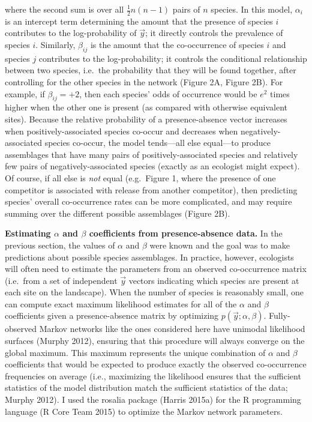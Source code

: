 \documentclass[12pt,]{article}
\begin{document}
\begin{spacing}{1.9}
\begin{flushleft}
\noindent where the second sum is over all \(\frac{1}{2}n(n-1)\) pairs
of \(n\) species. In this model, \(\alpha_{i}\) is an intercept term
determining the amount that the presence of species \(i\) contributes to
the log-probability of \(\vec{y}\); it directly controls the prevalence
of species \(i\). Similarly, \(\beta_{ij}\) is the amount that the
co-occurrence of species \(i\) and species \(j\) contributes to the
log-probability; it controls the conditional relationship between two
species, i.e.~the probability that they will be found together, after
controlling for the other species in the network (Figure 2A, Figure 2B).
For example, if \(\beta_{ij} = +2\), then each species' odds of
occurrence would be \(e^2\) times higher when the other one is present
(as compared with otherwise equivalent sites). Because the relative
probability of a presence-absence vector increases when
positively-associated species co-occur and decreases when
negatively-associated species co-occur, the model tends---all else
equal---to produce assemblages that have many pairs of
positively-associated species and relatively few pairs of
negatively-associated species (exactly as an ecologist might expect). Of
course, if all else is \emph{not} equal (e.g.~Figure 1, where the
presence of one competitor is associated with release from another
competitor), then predicting species' overall co-occurrence rates can be
more complicated, and may require summing over the different possible
assemblages (Figure 2B).

\noindent \textbf{Estimating $\alpha$ and $\beta$ coefficients from presence-absence data.}
In the previous section, the values of \(\alpha\) and \(\beta\) were
known and the goal was to make predictions about possible species
assemblages. In practice, however, ecologists will often need to
estimate the parameters from an observed co-occurrence matrix (i.e.~from
a set of independent \(\vec{y}\) vectors indicating which species are
present at each site on the landscape). When the number of species is
reasonably small, one can compute exact maximum likelihood estimates for
all of the \(\alpha\) and \(\beta\) coefficients given a
presence-absence matrix by optimizing \(p(\vec{y}; \alpha, \beta)\).
Fully-observed Markov networks like the ones considered here have
unimodal likelihood surfaces (Murphy 2012), ensuring that this procedure
will always converge on the global maximum. This maximum represents the
unique combination of \(\alpha\) and \(\beta\) coefficients that would
be expected to produce exactly the observed co-occurrence frequencies on
average (i.e., maximizing the likelihood ensures that the sufficient
statistics of the model distribution match the sufficient statistics of
the data; Murphy 2012). I used the rosalia package (Harris 2015a) for
the R programming language (R Core Team 2015) to optimize the Markov
network parameters.


\end{flushleft}
\end{spacing}
\end{document}
